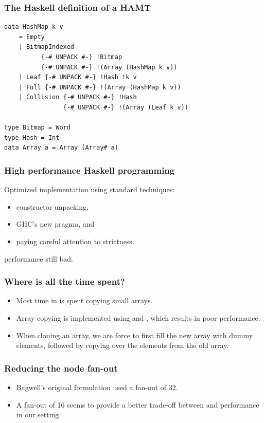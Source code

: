 \documentclass[xetex,mathserif,serif]{beamer}
\newcommand{\code}[1]{\mbox{\texttt{\small{\color{CodeColor}{#1}}}}}
\begin{document}
\begin{frame}[fragile]
  \frametitle{The Haskell definition of a HAMT}
  \begin{lstlisting}
data HashMap k v
    = Empty
    | BitmapIndexed
          {-# UNPACK #-} !Bitmap
          {-# UNPACK #-} !(Array (HashMap k v))
    | Leaf {-# UNPACK #-} !Hash !k v
    | Full {-# UNPACK #-} !(Array (HashMap k v))
    | Collision {-# UNPACK #-} !Hash
                {-# UNPACK #-} !(Array (Leaf k v))

type Bitmap = Word
type Hash = Int
data Array a = Array (Array# a)
  \end{lstlisting}
\end{frame}

\begin{frame}
  \frametitle{High performance Haskell programming}
  Optimized implementation using standard techniques:
  \begin{itemize}
  \item constructor unpacking,
  \item GHC's new \code{INLINABLE} pragma, and
  \item paying careful attention to strictness.
  \end{itemize}
  \code{insert} performance still bad.
\end{frame}

\begin{frame}
  \frametitle{Where is all the time spent?}

  \begin{itemize}
  \item Most time in \code{insert} is spent copying small arrays.
  \item Array copying is implemented using \code{indexArray\#}
    and \code{writeArray\#}, which results in poor performance.
  \item When cloning an array, we are force to first fill the new
    array with dummy elements, followed by copying over the elements
    from the old array.
  \end{itemize}
\end{frame}

\begin{frame}
  \frametitle{Reducing the node fan-out}

  \begin{itemize}
  \item Bagwell's original formulation used a fan-out of 32.
  \item A fan-out of 16 seems to provide a better trade-off between
    \code{lookup} and \code{insert} performance in our setting.
  \end{itemize}
\end{frame}
\end{document}
